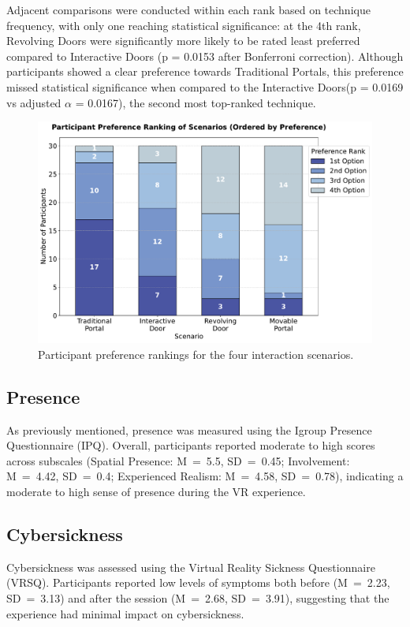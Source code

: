 Adjacent comparisons were conducted within each rank based on technique frequency, with only one reaching statistical significance: 
at the 4th rank, Revolving Doors were significantly more likely to be rated least preferred compared to Interactive Doors 
(p = 0.0153 after Bonferroni correction). Although participants showed a clear preference towards Traditional Portals, this 
preference missed statistical significance when compared to the Interactive Doors(p = 0.0169 vs adjusted $\alpha$ = 0.0167), 
the second most top-ranked technique.

\begin{figure}[h]
    \centering
    \includegraphics[width=.65\textwidth]{NOVAthesisFiles/Images/graphs/scenario_preference_plot.pdf}
    \caption[Participants preference rankings over portal techniques.]
    {Participant preference rankings for the four interaction scenarios.}
    \label{fig:user-preference}
\end{figure}

\subsection{Presence}
\label{sec:presence}

As previously mentioned, presence was measured using the Igroup Presence Questionnaire (IPQ). 
Overall, participants reported moderate to high scores across subscales (Spatial Presence: M~=~5.5, SD~=~0.45; 
Involvement: M~=~4.42, SD~=~0.4; Experienced Realism: M~=~4.58, SD~=~0.78), indicating a moderate to high sense of 
presence during the \gls{VR} experience. 

\subsection{Cybersickness}
\label{sec:cybersickness}
Cybersickness was assessed using the Virtual Reality Sickness Questionnaire (VRSQ). 
Participants reported low levels of symptoms both before (M~=~2.23, SD~=~3.13) and after the session (M~=~2.68, SD~=~3.91),
suggesting that the experience had minimal impact on cybersickness.

